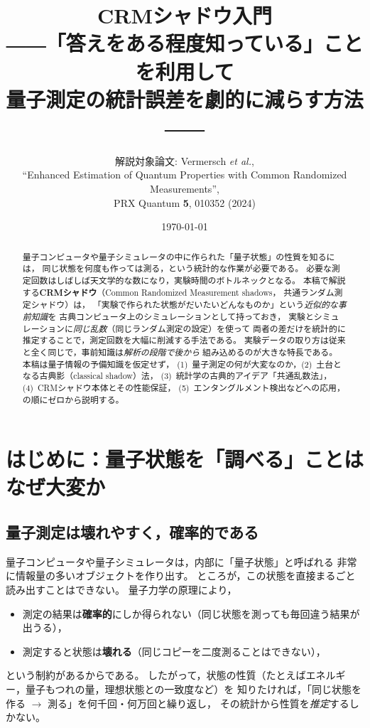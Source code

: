 \documentclass[11pt]{ltjsarticle}
\title{\textbf{CRMシャドウ入門}\\[4pt]
\large ――「答えをある程度知っている」ことを利用して\\
量子測定の統計誤差を劇的に減らす方法――}
\author{解説対象論文: Vermersch \textit{et al.},\\
``Enhanced Estimation of Quantum Properties with Common Randomized Measurements'',\\
PRX Quantum \textbf{5}, 010352 (2024)}
\date{\today}
\begin{document}
\maketitle

\begin{abstract}
量子コンピュータや量子シミュレータの中に作られた「量子状態」の性質を知るには，
同じ状態を何度も作っては測る，という統計的な作業が必要である。
必要な測定回数はしばしば天文学的な数になり，実験時間のボトルネックとなる。
本稿で解説する\textbf{CRMシャドウ}（Common Randomized Measurement shadows，
共通ランダム測定シャドウ）は，
「実験で作られた状態がだいたいどんなものか」という\emph{近似的な事前知識}を
古典コンピュータ上のシミュレーションとして持っておき，
実験とシミュレーションに\emph{同じ乱数}（同じランダム測定の設定）を使って
両者の差だけを統計的に推定することで，測定回数を大幅に削減する手法である。
実験データの取り方は従来と全く同じで，事前知識は\emph{解析の段階で後から}
組み込めるのが大きな特長である。
本稿は量子情報の予備知識を仮定せず，
(1)~量子測定の何が大変なのか，(2)~土台となる古典影（classical shadow）法，
(3)~統計学の古典的アイデア「共通乱数法」，(4)~CRMシャドウ本体とその性能保証，
(5)~エンタングルメント検出などへの応用，の順にゼロから説明する。
\end{abstract}

\tableofcontents
\clearpage

\section{はじめに：量子状態を「調べる」ことはなぜ大変か}

\subsection{量子測定は壊れやすく，確率的である}

量子コンピュータや量子シミュレータは，内部に「量子状態」と呼ばれる
非常に情報量の多いオブジェクトを作り出す。
ところが，この状態を直接まるごと読み出すことはできない。
量子力学の原理により，
\begin{itemize}
  \item 測定の結果は\textbf{確率的}にしか得られない（同じ状態を測っても毎回違う結果が出うる），
  \item 測定すると状態は\textbf{壊れる}（同じコピーを二度測ることはできない），
\end{itemize}
という制約があるからである。
したがって，状態の性質（たとえばエネルギー，量子もつれの量，理想状態との一致度など）を
知りたければ，「同じ状態を作る $\to$ 測る」を何千回・何万回と繰り返し，
その統計から性質を\emph{推定}するしかない。
\end{document}
